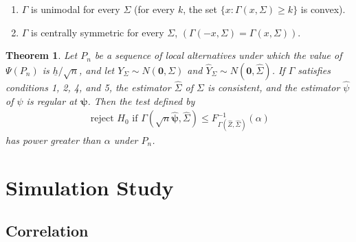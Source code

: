 \documentclass{article}
\newtheorem{theorem}{Theorem}
\newcommand{\rvv}{Z}
\newcommand{\nrvs}{Y_\Sigma}
\newcommand{\gamestz}{\Gamma(\hat{\rvv}, \hat{\Sigma})}
\newcommand{\gamestp}{\Gamma(\sqrt{n}\hat{\boldsymbol{\psi}}, \hat{\Sigma})}
\newcounter{conditions}
\begin{document}
\begin{enumerate}
	\setcounter{enumi}{\value{conditions}}
	\item $\Gamma$ is unimodal for every $\Sigma$ (for every $k$, the set $\{x : \Gamma(x, \Sigma) \geq k\}$ is convex).
	\item $\Gamma$ is centrally symmetric for every $\Sigma$, $(\Gamma(-x, \Sigma) = \Gamma(x, \Sigma))$.
\end{enumerate}

\begin{theorem}
	\label{thm:unbiased_locl_alt}
Let $P_{n}$ be a sequence of local alternatives under which the value of $\Psi(P_n)$ is $\underline{h}/\sqrt{n}$, and let $\nrvs \sim N\left(\boldsymbol{0}, \Sigma\right)$ and  $\hat{Y}_{\Sigma} \sim N\left(\boldsymbol{0}, \hat{\Sigma}\right)$.  If $\Gamma$ satisfies conditions 1, 2, 4, and 5, the estimator $\hat{\Sigma}$ of $\Sigma$ is consistent, and the estimator $\hat{\psi}$ of $\psi$ is regular at $\boldsymbol{\psi}$. Then the test defined by 
\begin{align*}
	\text{ reject } H_0 \text{ if } \gamestp \leq F^{-1}_{\gamestz}(\alpha)
\end{align*}
has power greater than $\alpha$ under $P_n$.
\end{theorem}

\section{Simulation Study}
\label{sec:sim_stdy}

\subsection{Correlation}

\end{document}
